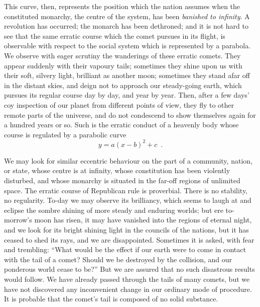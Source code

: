 \documentclass{jocg}
\theoremstyle{plain}
\theoremstyle{definition}
\begin{document}
This curve, then, represents the position which the nation assumes
when the constituted monarchy, the centre of the system, has been
\emph{banished to infinity}. A revolution has occurred; the monarch has
been dethroned; and it is not hard to see that the same erratic course
which the comet pursues in its flight, is observable with respect to the
social system which is represented by a parabola. We observe with eager
scrutiny the wanderings of these erratic comets. They appear suddenly
with their vapoury tails; sometimes they shine upon us with their soft,
silvery light, brilliant as another moon; sometimes they stand afar off
in the distant skies, and deign not to approach our steady-going earth,
which pursues its regular course day by day, and year by year. Then, after
a few days’ coy inspection of our planet from different points of view,
they fly to other remote parts of the universe, and do not condescend
to show themselves again for a  hundred years or so. Such is the erratic
conduct of a heavenly body whose course is regulated by a parabolic curve
\[
     y = a(x-b)^2 + c \enspace .
\]

We may look for similar eccentric behaviour on the part of a community,
nation, or state, whose centre is at infinity, whose constitution has
been violently disturbed, and whose monarchy is situated in the far-off
regions of unlimited space. The erratic course of Republican rule is
proverbial. There is no stability, no regularity. To-day we may observe
its brilliancy, which seems to laugh at and eclipse the sombre shining of
more steady and enduring worlds; but ere to-morrow's moon has risen,
it may have vanished into the regions of eternal night, and we look
for its bright shining light in the councils of the nations, but it has
ceased to shed its rays, and we are disappointed. Sometimes it is asked,
with fear and trembling: ``What would be the effect if our earth were
to come in contact with the tail of a comet? Should we be destroyed
by the collision, and our ponderous world cease to be?'' But we are
assured that no such disastrous results would follow. We have already
passed through the tails of many comets, but we have not discovered any
inconvenient change in our ordinary mode of procedure. It is probable
that the comet's tail is composed of no solid substance.
\end{document}
